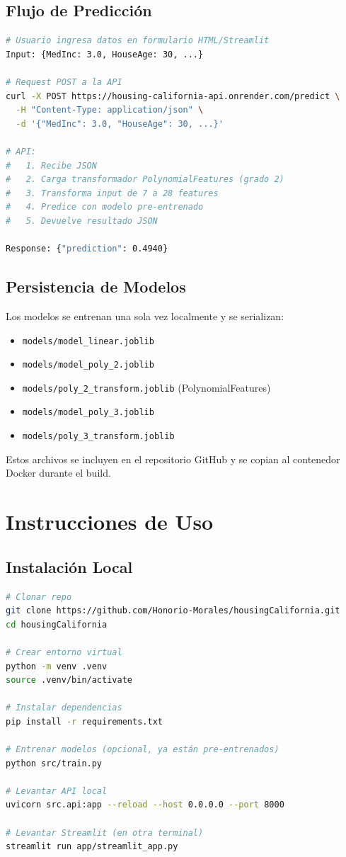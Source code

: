\documentclass[11pt,a4paper]{article}
\begin{document}
\subsection{Flujo de Predicción}

\begin{lstlisting}[language=bash]
# Usuario ingresa datos en formulario HTML/Streamlit
Input: {MedInc: 3.0, HouseAge: 30, ...}

# Request POST a la API
curl -X POST https://housing-california-api.onrender.com/predict \
  -H "Content-Type: application/json" \
  -d '{"MedInc": 3.0, "HouseAge": 30, ...}'

# API:
#   1. Recibe JSON
#   2. Carga transformador PolynomialFeatures (grado 2)
#   3. Transforma input de 7 a 28 features
#   4. Predice con modelo pre-entrenado
#   5. Devuelve resultado JSON

Response: {"prediction": 0.4940}
\end{lstlisting}

\subsection{Persistencia de Modelos}

Los modelos se entrenan una sola vez localmente y se serializan:
\begin{itemize}
  \item \texttt{models/model\_linear.joblib}
  \item \texttt{models/model\_poly\_2.joblib}
  \item \texttt{models/poly\_2\_transform.joblib} (PolynomialFeatures)
  \item \texttt{models/model\_poly\_3.joblib}
  \item \texttt{models/poly\_3\_transform.joblib}
\end{itemize}

Estos archivos se incluyen en el repositorio GitHub y se copian al contenedor Docker durante el build.

\section{Instrucciones de Uso}

\subsection{Instalación Local}

\begin{lstlisting}[language=bash]
# Clonar repo
git clone https://github.com/Honorio-Morales/housingCalifornia.git
cd housingCalifornia

# Crear entorno virtual
python -m venv .venv
source .venv/bin/activate

# Instalar dependencias
pip install -r requirements.txt

# Entrenar modelos (opcional, ya están pre-entrenados)
python src/train.py

# Levantar API local
uvicorn src.api:app --reload --host 0.0.0.0 --port 8000

# Levantar Streamlit (en otra terminal)
streamlit run app/streamlit_app.py
\end{lstlisting}
\end{document}
